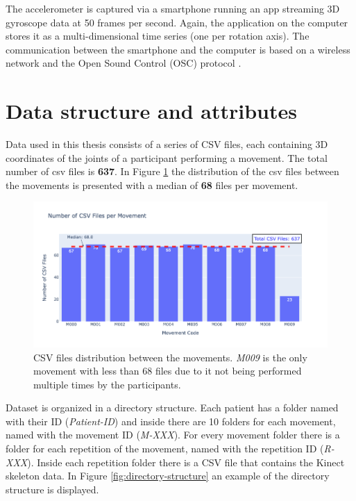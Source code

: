                     The accelerometer is captured via a smartphone running an app streaming 3D gyroscope data at 50 frames per second. Again, the application on the computer stores it as a multi-dimensional time series (one per rotation axis). The communication between the smartphone and the computer is based on a wireless network and the Open Sound Control (OSC) protocol \cite{wright_open_nodate}.
    
    \section{Data structure and attributes}
            
            Data used in this thesis consists of a series of CSV files, each containing 3D coordinates of the joints of a participant performing a movement. The total number of csv files is \textbf{637}. In Figure \ref{fig:dataset_files} the distribution of the csv files between the movements is presented with a median of \textbf{68} files per movement.

            \begin{figure}[H]
                \centering 
                \includegraphics[width=1.0\textwidth]{./resources/other/csv-files-mov.png}
                \caption{CSV files distribution between the movements. \textit{M009} is the only movement with less than 68 files due to it not being performed multiple times by the participants.}
                \label{fig:dataset_files}
            \end{figure}
        
            Dataset is organized in a directory structure. Each patient has a folder named with their ID (\textit{Patient-ID}) and inside there are 10 folders for each movement, named with the movement ID (\textit{M-XXX}). For every movement folder there is a folder for each repetition of the movement, named with the repetition ID (\textit{R-XXX}). Inside each repetition folder there is a CSV file that contains the Kinect skeleton data. In Figure \ref{fig:directory-structure} an example of the directory structure is displayed. \\
            
